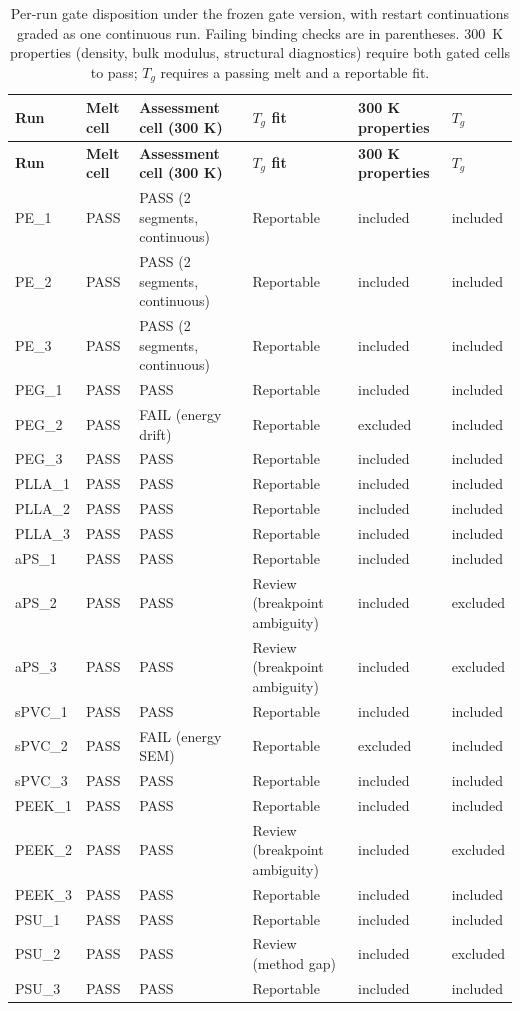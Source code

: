 \scriptsize
\begin{longtable}{l p{3.4cm} p{3.4cm} p{2.6cm} l l}
\caption{Per-run gate disposition under the frozen gate version, with restart continuations graded as one continuous run. Failing binding checks are in parentheses. 300~K properties (density, bulk modulus, structural diagnostics) require both gated cells to pass; $T_g$ requires a passing melt and a reportable fit.} \label{tab:si_disposition} \\
\toprule
\textbf{Run} & \textbf{Melt cell} & \textbf{Assessment cell (300 K)} & \textbf{$T_g$ fit} & \textbf{300 K properties} & \textbf{$T_g$} \\
\midrule
\endfirsthead
\toprule
\textbf{Run} & \textbf{Melt cell} & \textbf{Assessment cell (300 K)} & \textbf{$T_g$ fit} & \textbf{300 K properties} & \textbf{$T_g$} \\
\midrule
\endhead
\bottomrule
\endfoot
PE\_1 & PASS & PASS (2 segments, continuous) & Reportable & included & included \\
PE\_2 & PASS & PASS (2 segments, continuous) & Reportable & included & included \\
PE\_3 & PASS & PASS (2 segments, continuous) & Reportable & included & included \\
PEG\_1 & PASS & PASS & Reportable & included & included \\
PEG\_2 & PASS & FAIL (energy drift) & Reportable & excluded & included \\
PEG\_3 & PASS & PASS & Reportable & included & included \\
PLLA\_1 & PASS & PASS & Reportable & included & included \\
PLLA\_2 & PASS & PASS & Reportable & included & included \\
PLLA\_3 & PASS & PASS & Reportable & included & included \\
aPS\_1 & PASS & PASS & Reportable & included & included \\
aPS\_2 & PASS & PASS & Review (breakpoint ambiguity) & included & excluded \\
aPS\_3 & PASS & PASS & Review (breakpoint ambiguity) & included & excluded \\
sPVC\_1 & PASS & PASS & Reportable & included & included \\
sPVC\_2 & PASS & FAIL (energy SEM) & Reportable & excluded & included \\
sPVC\_3 & PASS & PASS & Reportable & included & included \\
PEEK\_1 & PASS & PASS & Reportable & included & included \\
PEEK\_2 & PASS & PASS & Review (breakpoint ambiguity) & included & excluded \\
PEEK\_3 & PASS & PASS & Reportable & included & included \\
PSU\_1 & PASS & PASS & Reportable & included & included \\
PSU\_2 & PASS & PASS & Review (method gap) & included & excluded \\
PSU\_3 & PASS & PASS & Reportable & included & included \\
\end{longtable}
\normalsize
